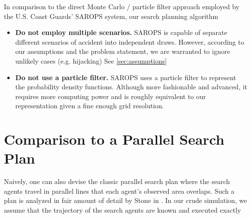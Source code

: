 \documentclass[12pt, letterpaper]{article}  %
\theoremstyle{definition}
\theoremstyle{remark}
\newtheorem{lem}[thm]{Lemma}
\theoremstyle{plain}
\begin{document}




In comparison to the direct Monte Carlo / particle filter approach employed by the U.S. Coast Guards' SAROPS system, our search planning algorithm
\begin{itemize}
	\item \textbf{Do not employ multiple scenarios.} SAROPS is capable of separate different scenarios of accident into independent draws. However, according to our assumptions and the problem statement, we are warranted to ignore unlikely cases (e.g. hijacking) See \ref{sec:assumptions}
	\item \textbf{Do not use a particle filter.} SAROPS uses a particle filter to represent the probability density functions. Although more fashionable and advanced, it requires more computing power and is roughly equivalent to our representation given a fine enough grid resolution.
\end{itemize}






\section{Comparison to a Parallel Search Plan}\label{sec:greedyalg}


Naively, one can also devise the classic parallel search plan where the search agents travel in parallel lines that each agent's observed area overlaps. Such a plan is analyzed in fair amount of detail by Stone in \cite{83stone}. In our crude simulation, we assume that the trajectory of the search agents are known and executed exactly
\end{document}
